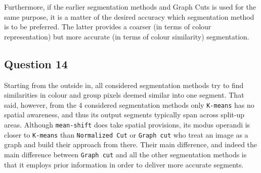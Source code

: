 Furthermore, if the earlier segmentation methods and Graph Cuts is used for
the same purpose, it is a matter of the desired accuracy which segmentation method
is to be preferred. The latter provides a coarser (in terms of colour representation)
but more accurate (in terms of colour similarity) segmentation.


\subsection{Question 14}

Starting from the outside in, all considered segmentation methods try to find
similarities in colour and group pixels deemed similar into one segment.
That said, however, from the 4 considered segmentation methods only
\texttt{K-means} has no spatial awareness, and thus its output segments typically
span across split-up areas. Although \texttt{mean-shift} does
take spatial provisions, its modus operandi is closer to \texttt{K-means} than
\texttt{Normalized Cut} or \texttt{Graph cut} who treat an image as a graph
and build their approach from there. Their main difference, and indeed the main
difference between \texttt{Graph cut} and all the other segmentation methods is
that it employs prior information in order to deliver more accurate segments.
